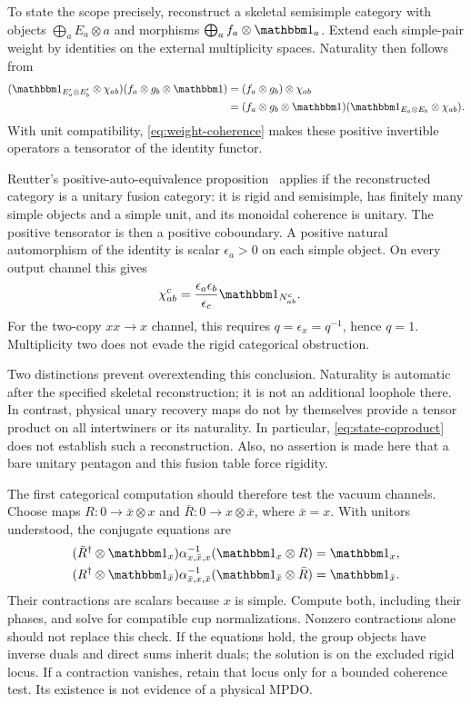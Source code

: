 \documentclass[aps,pra,reprint,nofootinbib,onecolumn]{revtex4-2}
\begin{document}
To state the scope precisely, reconstruct a skeletal semisimple
category with objects $\bigoplus_a E_a\otimes a$ and morphisms
$\bigoplus_a f_a\otimes\Id_a$. Extend each simple-pair weight by
identities on the external multiplicity spaces. Naturality then follows
from
\begin{align}
	(\Id_{E'_a\otimes E'_b}\otimes\chi_{ab})
	(f_a\otimes g_b\otimes\Id)
	 & =(f_a\otimes g_b)\otimes\chi_{ab}
	\nonumber                            \\
	 & =(f_a\otimes g_b\otimes\Id)
	(\Id_{E_a\otimes E_b}\otimes\chi_{ab}).
\end{align}
With unit compatibility, \cref{eq:weight-coherence} makes these positive
invertible operators a tensorator of the identity functor.

Reutter's positive-auto-equivalence proposition~\cite{Reutter} applies
if the reconstructed category is a unitary fusion category: it is
rigid and semisimple, has finitely many simple objects and a simple
unit, and its monoidal coherence is unitary.
The positive tensorator is then a positive coboundary. A positive
natural automorphism of the identity is scalar $\epsilon_a>0$ on
each simple object. On every output channel this gives
\begin{align}
	\chi_{ab}^{c}
	 & =\frac{\epsilon_a\epsilon_b}{\epsilon_c}
	\Id_{N_{ab}^{c}}.
	\label{eq:coboundary}
\end{align}
For the two-copy $xx\to x$ channel, this requires
$q=\epsilon_x=q^{-1}$, hence $q=1$. Multiplicity two does not evade
the rigid categorical obstruction.

Two distinctions prevent overextending this conclusion.
Naturality is automatic after the specified skeletal reconstruction;
it is not an additional loophole there. In contrast, physical unary
recovery maps do not by themselves provide a tensor product on all
intertwiners or its naturality. In particular,
\cref{eq:state-coproduct} does not establish such a reconstruction.
Also, no assertion is made here that a bare unitary pentagon and this
fusion table force rigidity.

The first categorical computation should therefore test the vacuum
channels. Choose maps
$R:0\to\bar x\otimes x$ and
$\bar R:0\to x\otimes\bar x$, where $\bar x=x$.
With unitors understood, the conjugate equations are
\begin{align}
	(\bar R^\dagger\otimes\Id_x)\alpha^{-1}_{x,\bar x,x}
	(\Id_x\otimes R)            & =\Id_x,
	\nonumber                                    \\
	(R^\dagger\otimes\Id_{\bar x})\alpha^{-1}_{\bar x,x,\bar x}
	(\Id_{\bar x}\otimes\bar R) & =\Id_{\bar x}.
	\label{eq:snakes}
\end{align}
Their contractions are scalars because $x$ is simple. Compute both,
including their phases, and solve for compatible cup normalizations.
Nonzero contractions alone should not replace this check.
If the equations hold, the group objects have inverse duals and
direct sums inherit duals; the solution is on the excluded rigid
locus. If a contraction vanishes, retain that locus only for a bounded
coherence test. Its existence is not evidence of a physical MPDO.
\end{document}
